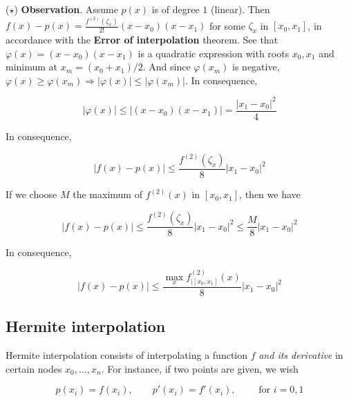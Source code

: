 \documentclass[12pt]{article}
\theoremstyle{definition}
\begin{document}
\begin{shaded}
    ($\star$) \textbf{Observation}. Assume $p(x)$ is of degree $1$ (linear).
    Then $f(x) - p(x) = \frac{ f^{(2)}(\zeta_x) }{2!}(x-x_0)(x-x_1)$ for some
    $\zeta_x$ in $[x_0, x_1]$, in
    accordance with the \textbf{Error of interpolation} theorem.
    See that $\varphi(x) = (x - x_0)(x- x_1)$ is a quadratic expression with
    roots $x_0, x_1$ and minimum at $x_m = (x_0 + x_1) / 2$. And since
    $\varphi(x_m)$ is negative, $\varphi(x) \geq \varphi(x_m) \Rightarrow
    \left| \varphi(x) \right| \leq |\varphi(x_m)|$. In consequence,

    \begin{equation*}
        |\varphi(x)| \leq \left| (x-x_0)(x-x_1) \right| = 
        \frac{\left| x_1 - x_0\right|^2 }{4}
    \end{equation*}

    In consequence, 

    \begin{equation*}
        \left| f(x) - p(x) \right| \leq \frac{ f^{(2)}(\zeta_x) }{8}\left| x_1 -
        x_0\right|^2
    \end{equation*}

    If we choose $M$ the maximum of $f^{(2)}(x)$ in $[x_0, x_1]$, then we
    have

    \begin{equation*}
        \left| f(x) - p(x) \right| \leq \frac{ f^{(2)}(\zeta_x) }{8}\left| x_1 -
        x_0\right|^2  \leq
        \frac{M}{8}\left| x_1 - x_0 \right|^2
    \end{equation*}

    In consequence, 

    \begin{equation*}
        \left| f(x) - p(x) \right| \leq \frac{\max_x f^{(2)}_{\mid [x_0,
        x_1]}(x)}{8} \left| x_1 - x_0 \right|^2
    \end{equation*}
\end{shaded}


\subsection{Hermite interpolation}

Hermite interpolation consists of interpolating a function $f$ \textit{and its
derivative} in certain nodes $x_0, \ldots, x_{n}$. For instance, if two points
are given, we wish 

\begin{equation*}
    p(x_i) = f(x_i), \qquad p'(x_i) = f'(x_i), \qquad \text{ for } i = 0, 1
\end{equation*}
\end{document}
